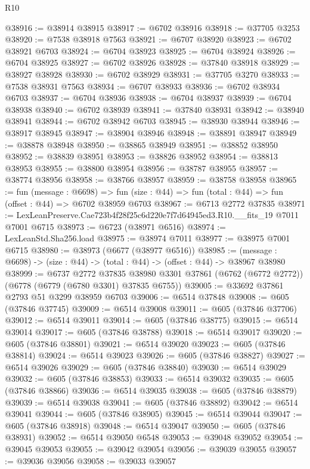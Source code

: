 \begin{lexlean}{R10}
\begin{coremodule}
@38916 := @38914 @38915
@38917 := @6702 @38916
@38918 := @37705 @3253
@38920 := @7538 @38918 @7563
@38921 := @6707 @38920
@38923 := @6702 @38921 @6703
@38924 := @6704 @38923
@38925 := @6704 @38924
@38926 := @6704 @38925
@38927 := @6702 @38926
@38928 := @37840 @38918
@38929 := @38927 @38928
@38930 := @6702 @38929
@38931 := @37705 @3270
@38933 := @7538 @38931 @7563
@38934 := @6707 @38933
@38936 := @6702 @38934 @6703
@38937 := @6704 @38936
@38938 := @6704 @38937
@38939 := @6704 @38938
@38940 := @6702 @38939
@38941 := @37840 @38931
@38942 := @38940 @38941
@38944 := @6702 @38942 @6703
@38945 := @38930 @38944
@38946 := @38917 @38945
@38947 := @38904 @38946
@38948 := @38891 @38947
@38949 := @38878 @38948
@38950 := @38865 @38949
@38951 := @38852 @38950
@38952 := @38839 @38951
@38953 := @38826 @38952
@38954 := @38813 @38953
@38955 := @38800 @38954
@38956 := @38787 @38955
@38957 := @38774 @38956
@38958 := @38766 @38957
@38959 := @38758 @38958
@38965 := fun (message : @6698) =>
  fun (size : @44) => fun (total : @44) => fun (offset : @44) => @6702 @38959 @6703
@38967 := @6713 @2772 @37835
@38971 := LexLeanPreserve.Cae723b4f28f25c6d220e7f7d64945ed3.R10.__fits_19 @7011 @7001 @6715
@38973 := @6723 (@38971 @6516)
@38974 := LexLeanStd.Sha256.load
@38975 := @38974 @7011
@38977 := @38975 @7001 @6715
@38980 := @38973 (@6677 (@38977 @6516))
@38985 := (message : @6698) -> (size : @44) -> (total : @44) -> (offset : @44) -> @38967 @38980
@38999 := @6737
    @2772
    @37835
    @38980
    @3301
    @37861
    (@6762 (@6772 @2772))
    (@6778 (@6779 (@6780 @3301) @37835 @6755))
@39005 := @33692 @37861 @2793 @51 @3299 @38959 @6703
@39006 := @6514 @37848
@39008 := @605 (@37846 @37745)
@39009 := @6514 @39008
@39011 := @605 (@37846 @37706)
@39012 := @6514 @39011
@39014 := @605 (@37846 @38775)
@39015 := @6514 @39014
@39017 := @605 (@37846 @38788)
@39018 := @6514 @39017
@39020 := @605 (@37846 @38801)
@39021 := @6514 @39020
@39023 := @605 (@37846 @38814)
@39024 := @6514 @39023
@39026 := @605 (@37846 @38827)
@39027 := @6514 @39026
@39029 := @605 (@37846 @38840)
@39030 := @6514 @39029
@39032 := @605 (@37846 @38853)
@39033 := @6514 @39032
@39035 := @605 (@37846 @38866)
@39036 := @6514 @39035
@39038 := @605 (@37846 @38879)
@39039 := @6514 @39038
@39041 := @605 (@37846 @38892)
@39042 := @6514 @39041
@39044 := @605 (@37846 @38905)
@39045 := @6514 @39044
@39047 := @605 (@37846 @38918)
@39048 := @6514 @39047
@39050 := @605 (@37846 @38931)
@39052 := @6514 @39050 @6548
@39053 := @39048 @39052
@39054 := @39045 @39053
@39055 := @39042 @39054
@39056 := @39039 @39055
@39057 := @39036 @39056
@39058 := @39033 @39057

\end{coremodule}
\end{lexlean}
